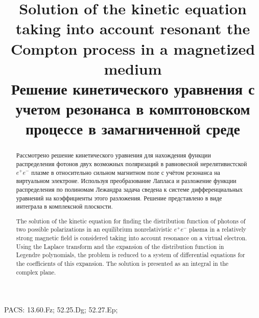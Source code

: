 \documentclass[a4paper]{panl}
\begin{document}

\title{Solution of the kinetic equation taking into account resonant the Compton process in a magnetized medium \\ Решение кинетического уравнения с учетом резонанса в комптоновском процессе в замагниченной среде}
\maketitle
{}
\setcounter{footnote}{0}

\begin{abstract}
Рассмотрено решение кинетического уравнения для нахождения функции распределения фотонов двух возможных поляризаций в равновесной нерелятивистской $e^+e^-$ плазме в относительно сильном магнитном поле с учётом резонанса на виртуальном электроне.
Используя преобразование Лапласа и разложение функции распределения по полиномам Лежандра задача сведена к системе дифференциальных уравнений на коэффициенты этого разложения. Решение представлено в виде интеграла в комплексной плоскости. \
\vspace{0.2cm}

The solution of the kinetic equation for finding the distribution function of photons of two possible polarizations in an equilibrium nonrelativistic $e^+e^-$ plasma in a relatively strong magnetic field is considered taking into account resonance on a virtual electron.
Using the Laplace transform and the expansion of the distribution function in Legendre polynomials, the problem is reduced to a system of differential equations for the coefficients of this expansion. The solution is presented as an integral in the complex plane.
\end{abstract}
\vspace*{6pt}

\noindent
 PACS: 13.60.Fz; 52.25.Dg; 52.27.Ep;

\label{sec:intro}
\end{document}
